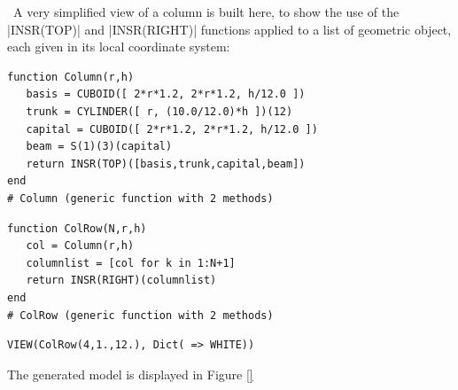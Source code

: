 \begin{coding}\
A very simplified view of a column is built here, to show the use of the |INSR(TOP)| and |INSR(RIGHT)| functions applied to a list of geometric object, each given in its local coordinate system:
\begin{lstlisting}[language=JuliaLocal, style=julia, mathescape=true]
function Column(r,h)
   basis = CUBOID([ 2*r*1.2, 2*r*1.2, h/12.0 ]) 
   trunk = CYLINDER([ r, (10.0/12.0)*h ])(12)
   capital = CUBOID([ 2*r*1.2, 2*r*1.2, h/12.0 ])
   beam = S(1)(3)(capital) 
   return INSR(TOP)([basis,trunk,capital,beam])
end
# Column (generic function with 2 methods)
\end{lstlisting}

\begin{lstlisting}[language=JuliaLocal, style=julia, mathescape=true]
function ColRow(N,r,h)
   col = Column(r,h)
   columnlist = [col for k in 1:N+1]
   return INSR(RIGHT)(columnlist)
end
# ColRow (generic function with 2 methods)
\end{lstlisting}

\begin{lstlisting}[language=JuliaLocal, style=julia, mathescape=true]
VIEW(ColRow(4,1.,12.), Dict( => WHITE))
\end{lstlisting}
The generated model is displayed in Figure \ref{}
\end{coding}



